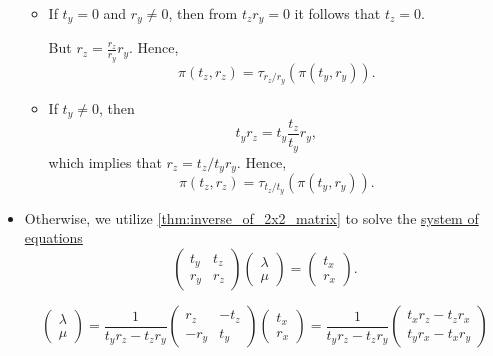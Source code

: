 \begin{defproof}
\begin{itemize}
\begin{itemize}
      \item If \( t_y = 0 \) and \( r_y \neq 0 \), then from \( t_z r_y = 0 \) it follows that \( t_z = 0 \).

      But \( r_z = \frac {r_z} {r_y} r_y \). Hence,
      \begin{equation*}
        \pi(t_z, r_z) = \tau_{r_z / r_y}(\pi(t_y, r_y)).
      \end{equation*}

      \item If \( t_y \neq 0 \), then
      \begin{equation*}
        t_y r_z = t_y \frac {t_z} {t_y} r_y,
      \end{equation*}
      which implies that \( r_z = t_z / t_y r_y \). Hence,
      \begin{equation*}
        \pi(t_z, r_z) = \tau_{t_z / t_y}(\pi(t_y, r_y)).
      \end{equation*}
    \end{itemize}

    \item Otherwise, we utilize \cref{thm:inverse_of_2x2_matrix} to solve the \hyperref[def:system_of_linear_equations]{system of equations}
    \begin{equation*}
      \begin{pmatrix}
        t_y & t_z \\
        r_y & r_z
      \end{pmatrix}
      \begin{pmatrix}
        \lambda \\
        \mu
      \end{pmatrix}
      =
      \begin{pmatrix}
        t_x \\ r_x
      \end{pmatrix}.
    \end{equation*}

    \begin{equation*}
      \begin{pmatrix}
        \lambda \\
        \mu
      \end{pmatrix}
      =
      \frac 1 {t_y r_z - t_z r_y}
      \begin{pmatrix}
        r_z  & -t_z \\
        -r_y & t_y
      \end{pmatrix}
      \begin{pmatrix}
        t_x \\ r_x
      \end{pmatrix}
      =
      \frac 1 {t_y r_z - t_z r_y}
      \begin{pmatrix}
        t_x r_z - t_z r_x \\
        t_y r_x - t_x r_y
      \end{pmatrix}
    \end{equation*}


\end{itemize}
\end{defproof}
